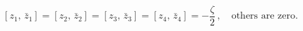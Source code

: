 \begin{equation}
\left[ z_1,\,\bar{z}_1\right]=\left[ z_2,\,\bar{z}_2\right]=
\left[ z_3,\,\bar{z}_3\right]=\left[ z_4,\,\bar{z}_4\right]= 
-\frac{\zeta}{2}\,,\quad 
\textrm{others are zero}.\label{eq:5.2}
\end{equation}

